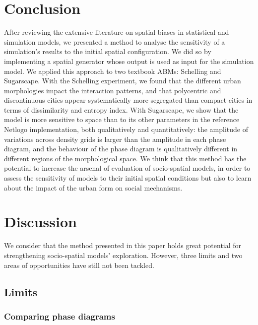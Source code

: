 \documentclass{JASSS}
\begin{document}
\section{Conclusion}
After reviewing the extensive literature on spatial biases in statistical and simulation models, we presented a method to analyse the sensitivity of a simulation's results to the initial spatial configuration. We did so by implementing a spatial generator whose output is used as input for the simulation model. We applied this approach to two textbook ABMs: Schelling and Sugarscape. With the Schelling experiment, we found that the different urban morphologies impact the interaction patterns, and that polycentric and discontinuous cities appear systematically more segregated than compact cities in terms of dissimilarity and entropy index. With Sugarscape, we show that the model is more sensitive to space than to its other parameters in the reference Netlogo implementation, both qualitatively and quantitatively: the amplitude of variations across density grids is larger than the amplitude in each phase diagram, and the behaviour of the phase diagram is qualitatively different in different regions of the morphological space. We think that this method has the potential to increase the arsenal of evaluation of socio-spatial models, in order to assess the sensitivity of models to their initial spatial conditions but also to learn about the impact of the urban form on social mechanisms.

\section{Discussion}

We consider that the method presented in this paper holds great potential for strengthening socio-spatial models' exploration. However, three limits and two areas of opportunities have still not been tackled. 

\subsection{Limits}

\subsubsection{Comparing phase diagrams}
\end{document}
